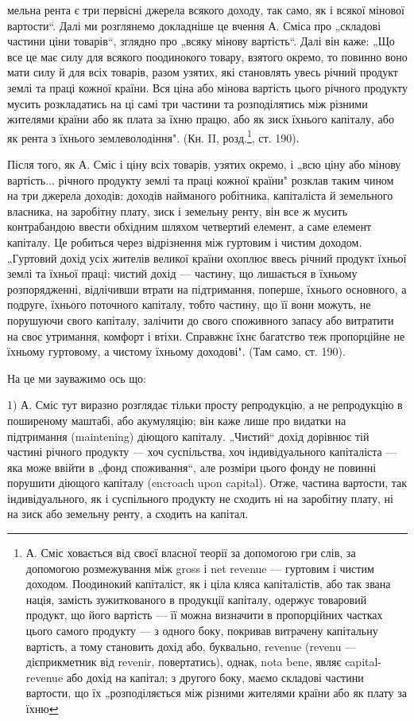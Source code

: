мельна рента є три первісні джерела всякого доходу, так само,
як і всякої мінової вартости“. Далі ми розглянемо докладніше це
вчення А. Сміса про „складові частини ціни товарів“, зглядно про „всяку
мінову вартість“. Далі він каже: „Що все це має силу для всякого
поодинокого товару, взятого окремо, то повинно воно мати силу й для
всіх товарів, разом узятих, які становлять увесь річний продукт
землі та праці кожної країни. Вся ціна або мінова вартість
цього річного продукту мусить розкладатись на ці самі три частини
та розподілятись між різними жителями країни або як плата за
їхню працю, або як зиск їхнього капіталу, або як рента з їхнього
землеволодіння". (Кн. II, розд.\footnote{
А. Сміс ховається від своєї власної теорії за допомогою гри слів,
за допомогою розмежування між gross і net revenue — гуртовим і чистим
доходом. Поодинокий капіталіст, як і ціла кляса капіталістів, або так
звана нація, замість зужиткованого в продукції капіталу, одержує товаровий
продукт, що його вартість — її можна визначити в пропорційних частках
цього самого продукту — з одного боку, покривав витрачену капітальну
вартість, а тому становить дохід або, буквально, revenue (revenu — дієприкметник
від revenir, повертатись), однак, nota bene, являє capital-revenue або
дохід на капітал; з другого боку, маємо складові частини вартости, що
їх „розподіляється між різними жителями країни або як плату за їхню
}, ст. 190).

Після того, як А. Сміс і ціну всіх товарів, узятих окремо, і „всю ціну
або мінову вартість... річного продукту землі та праці кожної країни"
розклав таким чином на три джерела доходів: доходів найманого робітника,
капіталіста й земельного власника, на заробітну плату, зиск і земельну
ренту, він все ж мусить контрабандою ввести обхідним шляхом
четвертий елемент, а саме елемент капіталу. Це робиться через відрізнення
між гуртовим і чистим доходом. „Гуртовий дохід усіх жителів великої
країни охоплює ввесь річний продукт їхньої землі та їхньої праці;
чистий дохід — частину, що лишається в їхньому розпорядженні,
відлічивши втрати на підтримання, поперше, їхнього основного,
а подруге, їхнього поточного капіталу, тобто
частину, що її вони можуть, не порушуючи свого капіталу, залічити
до свого споживного запасу або витратити на своє утримання, комфорт
і втіхи. Справжнє їхнє багатство теж пропорційне не їхньому гуртовому,
а чистому їхньому доходові". (Там само, ст. 190).

На це ми зауважимо ось що:

1) А. Сміс тут виразно розглядає тільки просту репродукцію, а не
репродукцію в поширеному маштабі, або акумуляцію; він каже лише про
видатки на підтримання (maintening) діющого капіталу. „Чистий“ дохід
дорівнює тій частині річного продукту — хоч суспільства, хоч індивідуального
капіталіста — яка може ввійти в „фонд споживання“, але розміри
цього фонду не повинні порушити діющого капіталу (encroach upon capital).
Отже, частина вартости, так індивідуального, як і суспільного продукту
не сходить ні на заробітну плату, ні на зиск або земельну ренту,
а сходить на капітал.